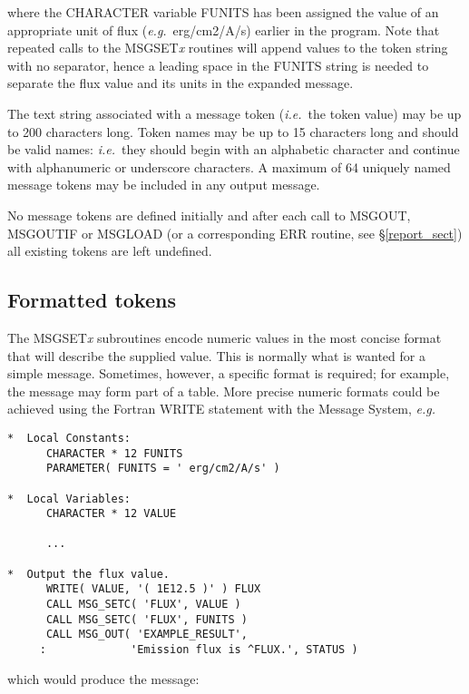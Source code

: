 \documentclass[twoside,11pt]{article}
\newcommand{\htmlref}[2]{#1}
\newcommand{\latex}[1]{#1}
\newcommand{\xlabel}[1]{}
\renewcommand{\_}{\texttt{\symbol{95}}}
\begin{document}
where the CHARACTER variable FUNITS has been assigned the value of an 
appropriate unit of flux (\textit{e.g.}\ erg/cm2/A/s) earlier in the program.
Note that repeated calls to the MSG\_SET\textit{x} routines will append values 
to the token string with no separator, hence a leading space in the FUNITS 
string is needed to separate the flux value and its units in the expanded 
message.

The text string associated with a message token (\textit{i.e.}\ the token value)
may be up to 200 characters long.
Token names may be up to 15 characters long and should be valid names:
\textit{i.e.}\ they should begin with an alphabetic character and continue with
alphanumeric or underscore characters.
A maximum of 64 uniquely named message tokens may be included in any output
message. 

No message tokens are defined initially and
after each call to MSG\_OUT, MSG\_OUTIF or MSG\_LOAD (or 
\htmlref{a corresponding ERR 
routine}{report_sect}\latex{, see \S\ref{report_sect}}) 
all existing tokens are left undefined. 

\subsection{\xlabel{formatted_tokens}Formatted tokens}
The MSG\_SET\textit{x} subroutines encode numeric values in the most concise 
format that will describe the supplied value. 
This is normally what is wanted for a simple message. 
Sometimes, however, a specific format is required; for example, the message
may form part of a table. 
More precise numeric formats could be achieved using the Fortran WRITE
statement with the Message System, \textit{e.g.}

\begin {small}
\begin{verbatim}
*  Local Constants:
      CHARACTER * 12 FUNITS
      PARAMETER( FUNITS = ' erg/cm2/A/s' )

*  Local Variables:
      CHARACTER * 12 VALUE

      ...

*  Output the flux value.
      WRITE( VALUE, '( 1E12.5 )' ) FLUX
      CALL MSG_SETC( 'FLUX', VALUE )
      CALL MSG_SETC( 'FLUX', FUNITS )
      CALL MSG_OUT( 'EXAMPLE_RESULT', 
     :             'Emission flux is ^FLUX.', STATUS )
\end{verbatim}
\end {small}

which would produce the message:
\end{document}
